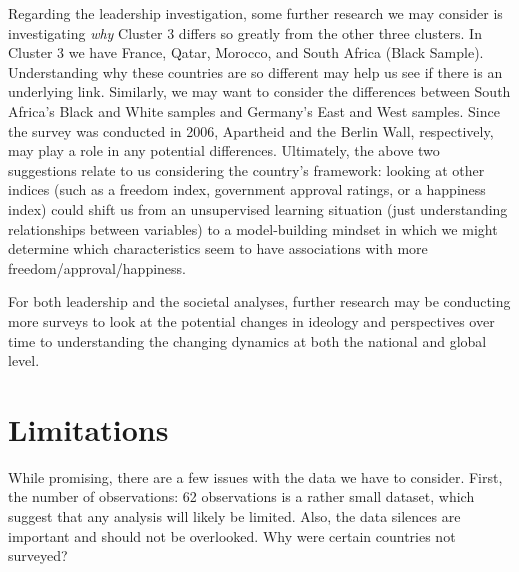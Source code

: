 \documentclass[
]{article}
\begin{document}
Regarding the leadership investigation, some further research we may
consider is investigating \emph{why} Cluster 3 differs so greatly from
the other three clusters. In Cluster 3 we have France, Qatar, Morocco,
and South Africa (Black Sample). Understanding why these countries are
so different may help us see if there is an underlying link. Similarly,
we may want to consider the differences between South Africa's Black and
White samples and Germany's East and West samples. Since the survey was
conducted in 2006, Apartheid and the Berlin Wall, respectively, may play
a role in any potential differences. Ultimately, the above two
suggestions relate to us considering the country's framework: looking at
other indices (such as a freedom index, government approval ratings, or
a happiness index) could shift us from an unsupervised learning
situation (just understanding relationships between variables) to a
model-building mindset in which we might determine which characteristics
seem to have associations with more freedom/approval/happiness.

For both leadership and the societal analyses, further research may be
conducting more surveys to look at the potential changes in ideology and
perspectives over time to understanding the changing dynamics at both
the national and global level.

\hypertarget{limitations}{%
\section{Limitations}\label{limitations}}

While promising, there are a few issues with the data we have to
consider. First, the number of observations: 62 observations is a rather
small dataset, which suggest that any analysis will likely be limited.
Also, the data silences are important and should not be overlooked. Why
were certain countries not surveyed?
\end{document}
